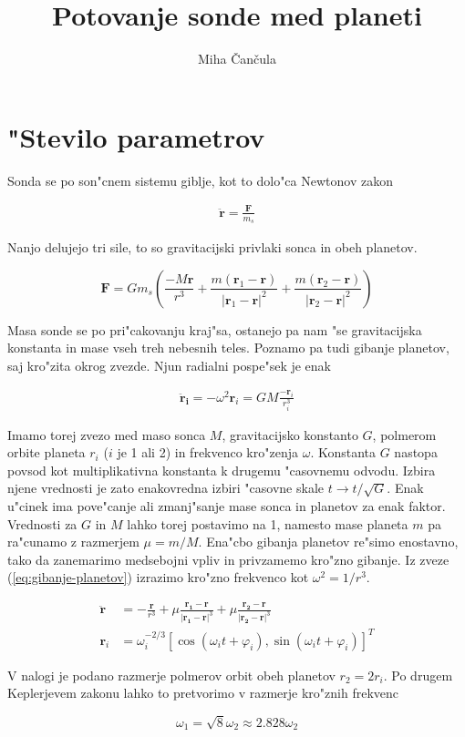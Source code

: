 \documentclass[a4paper,10pt]{article}
\title{Potovanje sonde med planeti}
\author{Miha \v Can\v cula}
\renewcommand{\vec}{\mathbf}
\renewcommand{\phi}{\varphi}
\newcommand{\drug}[1]{
  \vec{\ddot{#1}}
}
\begin{document}
\maketitle

\section{"Stevilo parametrov}

Sonda se po son"cnem sistemu giblje, kot to dolo"ca Newtonov zakon

\begin{align}
  \vec{\ddot r}= \frac{\vec F}{m_s}
\end{align}

Nanjo delujejo tri sile, to so gravitacijski privlaki sonca in obeh planetov. 

$$ \vec F = Gm_s \left( \frac{-M\vec r}{r^3} + \frac{m(\vec r_1 - \vec r)}{|\vec r_1 - \vec r|^2} + \frac{m(\vec r_2 - \vec r)}{|\vec r_2 - \vec r|^2} \right) $$

Masa sonde se po pri"cakovanju kraj"sa, ostanejo pa nam "se gravitacijska konstanta in mase vseh treh nebesnih teles. Poznamo pa tudi gibanje planetov, saj kro"zita okrog zvezde. Njun radialni pospe"sek je enak

\begin{align}
\label{eq:gibanje-planetov}
\vec{\ddot r_i} = -\omega^2\vec r_i = GM \frac{-\vec r_i}{r_i^3}
\end{align}

Imamo torej zvezo med maso sonca $M$, gravitacijsko konstanto $G$, polmerom orbite planeta $r_i$ ($i$ je 1 ali 2) in frekvenco kro"zenja $\omega$. Konstanta $G$ nastopa povsod kot multiplikativna konstanta k drugemu "casovnemu odvodu. Izbira njene vrednosti je zato enakovredna izbiri "casovne skale $t \to t/\sqrt{G}$. Enak u"cinek ima pove"canje ali zmanj"sanje mase sonca in planetov za enak faktor. Vrednosti za $G$ in $M$ lahko torej postavimo na 1, namesto mase planeta $m$ pa ra"cunamo z razmerjem $\mu = m/M$. Ena"cbo gibanja planetov re"simo enostavno, tako da zanemarimo medsebojni vpliv in privzamemo kro"zno gibanje. Iz zveze (\ref{eq:gibanje-planetov}) izrazimo kro"zno frekvenco kot $\omega^2 = 1/r^3$. 

\begin{align}
\drug r &= -\frac{\vec r}{r^3} + \mu\frac{\vec{r_1-r}}{|\vec{r_1-r}|^3} + \mu\frac{\vec{r_2-r}}{|\vec{r_2-r}|^3} \\
\vec r_i &= \omega_i^{-2/3} \left[ \cos(\omega_i t + \phi_i), \sin(\omega_i t + \phi_i) \right]^T
\end{align}

V nalogi je podano razmerje polmerov orbit obeh planetov $r_2 = 2r_i$. Po drugem Keplerjevem zakonu lahko to pretvorimo v razmerje kro"znih frekvenc

\[ \omega_1 = \sqrt{8}\omega_2 \approx 2.828 \omega_2 \]
\end{document}
